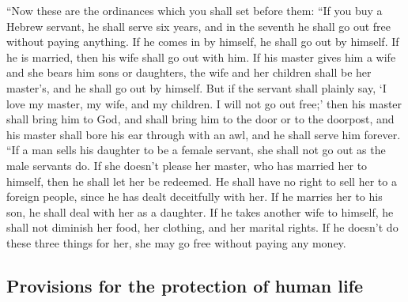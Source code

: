  ``Now these are the ordinances which you shall set before
them:  ``If you buy a Hebrew servant, he shall serve six
years, and in the seventh he shall go out free without paying anything.
 If he comes in by himself, he shall go out by himself. If
he is married, then his wife shall go out with him.  If
his master gives him a wife and she bears him sons or daughters, the
wife and her children shall be her master's, and he shall go out by
himself.  But if the servant shall plainly say, `I love my
master, my wife, and my children. I will not go out free;'
 then his master shall bring him to God, and shall bring
him to the door or to the doorpost, and his master shall bore his ear
through with an awl, and he shall serve him forever.  ``If
a man sells his daughter to be a female servant, she shall not go out as
the male servants do.  If she doesn't please her master,
who has married her to himself, then he shall let her be redeemed. He
shall have no right to sell her to a foreign people, since he has dealt
deceitfully with her.  If he marries her to his son, he
shall deal with her as a daughter.  If he takes another
wife to himself, he shall not diminish her food, her clothing, and her
marital rights.  If he doesn't do these three things for
her, she may go free without paying any money.

\hypertarget{provisions-for-the-protection-of-human-life}{%
\subsection{Provisions for the protection of human
life}\label{provisions-for-the-protection-of-human-life}}

